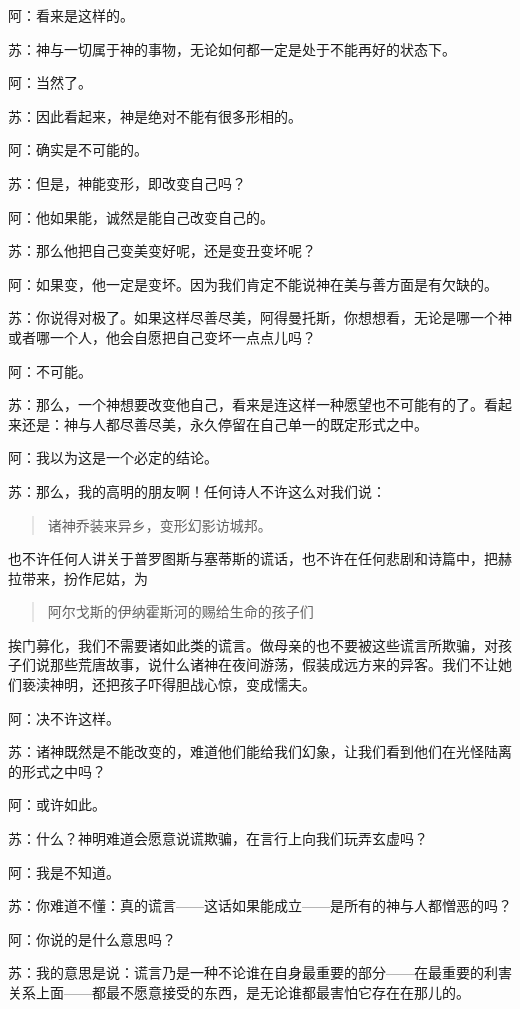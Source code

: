 \documentclass[11pt,oneside]{book}
\begin{document}
\begin{common-format}
阿：看来是这样的。

苏：神与一切属于神的事物，无论如何都一定是处于不能再好的状态下。

阿：当然了。

苏：因此看起来，神是绝对不能有很多形相的。

阿：确实是不可能的。

苏：但是，神能变形，即改变自己吗？

阿：他如果能，诚然是能自己改变自己的。

苏：那么他把自己变美变好呢，还是变丑变坏呢？

阿：如果变，他一定是变坏。因为我们肯定不能说神在美与善方面是有欠缺的。

苏：你说得对极了。如果这样尽善尽美，阿得曼托斯，你想想看，无论是哪一个神或者哪一个人，他会自愿把自己变坏一点点儿吗？

阿：不可能。

苏：那么，一个神想要改变他自己，看来是连这样一种愿望也不可能有的了。看起来还是：神与人都尽善尽美，永久停留在自己单一的既定形式之中。

阿：我以为这是一个必定的结论。

苏：那么，我的高明的朋友啊！任何诗人不许这么对我们说：
\begin{verse}
诸神乔装来异乡，变形幻影访城邦。
\end{verse}
也不许任何人讲关于普罗图斯与塞蒂斯的谎话，也不许在任何悲剧和诗篇中，把赫拉带来，扮作尼姑，为
\begin{verse}
阿尔戈斯的伊纳霍斯河的赐给生命的孩子们
\end{verse}
挨门募化，我们不需要诸如此类的谎言。做母亲的也不要被这些谎言所欺骗，对孩子们说那些荒唐故事，说什么诸神在夜间游荡，假装成远方来的异客。我们不让她们亵渎神明，还把孩子吓得胆战心惊，变成懦夫。

阿：决不许这样。

苏：诸神既然是不能改变的，难道他们能给我们幻象，让我们看到他们在光怪陆离的形式之中吗？

阿：或许如此。

苏：什么？神明难道会愿意说谎欺骗，在言行上向我们玩弄玄虚吗？

阿：我是不知道。

苏：你难道不懂：真的谎言——这话如果能成立——是所有的神与人都憎恶的吗？

阿：你说的是什么意思吗？

苏：我的意思是说：谎言乃是一种不论谁在自身最重要的部分——在最重要的利害关系上面——都最不愿意接受的东西，是无论谁都最害怕它存在在那儿的。


\end{common-format}
\end{document}
